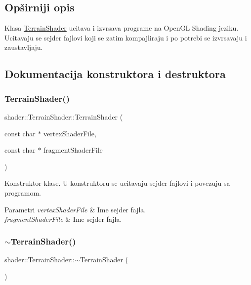 \subsection{Opširniji opis}
Klasa \hyperlink{classshader_1_1TerrainShader}{Terrain\+Shader} ucitava i izvrsava programe na Open\+GL Shading jeziku. Ucitavaju se sejder fajlovi koji se zatim kompajliraju i po potrebi se izvrsavaju i zaustavljaju. 

\subsection{Dokumentacija konstruktora i destruktora}
\mbox{\label{classshader_1_1TerrainShader_a8d6dee90d8aabf83f0a5576c65d2e6e1}} 
\subsubsection{\texorpdfstring{Terrain\+Shader()}{TerrainShader()}}
{\footnotesize\ttfamily shader\+::\+Terrain\+Shader\+::\+Terrain\+Shader (\begin{DoxyParamCaption}\item[{const char $\ast$}]{vertex\+Shader\+File,  }\item[{const char $\ast$}]{fragment\+Shader\+File }\end{DoxyParamCaption})}



Konstruktor klase. U konstruktoru se ucitavaju sejder fajlovi i povezuju sa programom. 


\begin{DoxyParams}{Parametri}
{\em vertex\+Shader\+File} & Ime sejder fajla. \\
\hline
{\em fragment\+Shader\+File} & Ime sejder fajla. \\
\hline
\end{DoxyParams}
\mbox{\label{classshader_1_1TerrainShader_afc13c4f8a4b8b6f737c9729d47c62550}} 
\subsubsection{\texorpdfstring{$\sim$\+Terrain\+Shader()}{~TerrainShader()}}
{\footnotesize\ttfamily shader\+::\+Terrain\+Shader\+::$\sim$\+Terrain\+Shader (\begin{DoxyParamCaption}{ }\end{DoxyParamCaption})}



